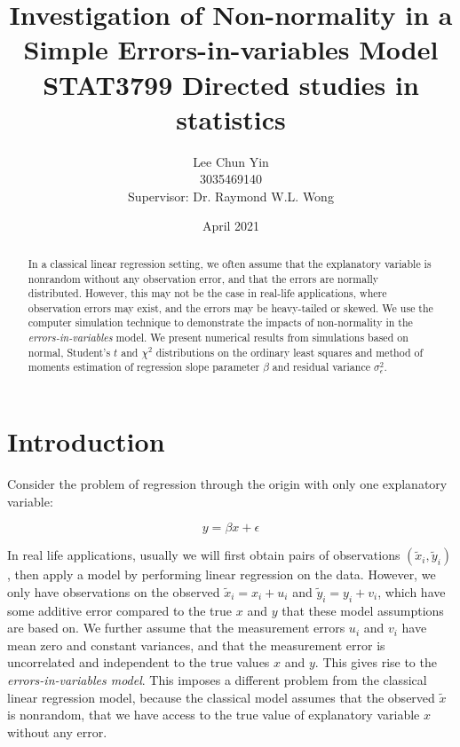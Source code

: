 \documentclass{article}
\title{Investigation of Non-normality in a Simple Errors-in-variables Model\\[1cm]
STAT3799 Directed studies in statistics}
\author{Lee Chun Yin\\
3035469140\\[1cm]{\small Supervisor: Dr. Raymond W.L. Wong}
}
\date{April 2021}
\begin{document}
\maketitle

\begin{abstract}

In a classical linear regression setting, we often assume that the explanatory variable is nonrandom without any observation error, and that the errors are normally distributed.
However, this may not be the case in real-life applications, where observation errors may exist, and the errors may be heavy-tailed or skewed.
We use the computer simulation technique to demonstrate the impacts of non-normality in the \textit{errors-in-variables} model.
We present numerical results from simulations based on normal, Student's $t$ and $\chi^2$ distributions on the ordinary least squares and method of moments estimation of regression slope parameter $\beta$ and residual variance $\sigma^2_\epsilon$.

\end{abstract}

\section{Introduction}

Consider the problem of regression through the origin with only one explanatory variable:

\begin{equation}
y = \beta x + \epsilon
\end{equation}

In real life applications, usually we will first obtain pairs of observations $(\tilde{x}_i, \tilde{y}_i)$, then apply a model by performing linear regression on the data.
However, we only have observations on the observed $\tilde{x}_i = x_i + u_i$ and $\tilde{y}_i = y_i + v_i$, which have some additive error compared to the true $x$ and $y$ that these model assumptions are based on.
We further assume that the measurement errors $u_i$ and $v_i$ have mean zero and constant variances, and that the measurement error is uncorrelated and independent to the true values $x$ and $y$.
This gives rise to the \textit{errors-in-variables model}.
This imposes a different problem from the classical linear regression model, because the classical model assumes that the observed $\tilde{x}$ is nonrandom, that we have access to the true value of explanatory variable $x$ without any error. 
\end{document}
